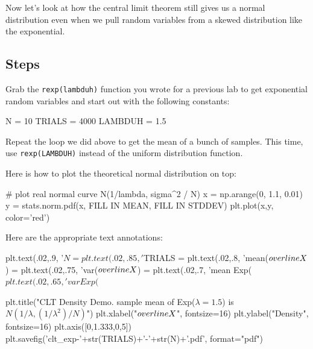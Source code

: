\begin{fullwidth}
Now let's look at how the central limit theorem still gives us a normal distribution even when we pull random variables from a skewed distribution like the exponential.

\subsection{Steps}

\step Grab the {\tt rexp(lambduh)} function you wrote for a previous lab to get exponential random variables and start out with the following constants:

\begin{pyverbatim}
N = 10
TRIALS = 4000
LAMBDUH = 1.5
\end{pyverbatim}

\step Repeat the loop we did above to get the mean of a bunch of samples. This time, use {\tt rexp(LAMBDUH)} instead of the uniform distribution function.

\step Here is how to plot the theoretical normal distribution on top:

\begin{pyverbatim}
# plot real normal curve N(1/lambda, sigma^2 / N)
x = np.arange(0, 1.1, 0.01)
y = stats.norm.pdf(x, FILL IN MEAN, FILL IN STDDEV)
plt.plot(x,y, color='red')
\end{pyverbatim}

\step Here are the appropriate text annotations:

{\small
\begin{pyverbatim}
plt.text(.02,.9, '$N = %
plt.text(.02,.85, '$TRIALS = %
plt.text(.02,.8,   'mean($\\overline{X}$) = %
plt.text(.02,.75, 'var($\\overline{X}$) = %
plt.text(.02,.7, 'mean Exp($%
plt.text(.02,.65, 'var Exp($%

plt.title("CLT Density Demo. sample mean of Exp($\lambda=1.5$) is $N(1/\lambda, (1/\lambda^2)/N)$")
plt.xlabel("$\\overline{X}$", fontsize=16)
plt.ylabel("Density", fontsize=16)
plt.axis([0,1.333,0,5])
plt.savefig('clt_exp-'+str(TRIALS)+'-'+str(N)+'.pdf', format="pdf")
\end{pyverbatim}
}


\end{fullwidth}
